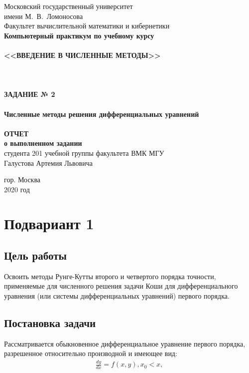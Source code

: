 \documentclass[a4paper,12pt,titlepage,finall]{article}
\begin{document}
\begin{titlepage}
    \begin{center}
	{\small \sc Московский государственный университет \\имени М.~В.~Ломоносова\\
	Факультет вычислительной математики и кибернетики\\}
	\hrulefill
	\vfill
	{\large \bf Компьютерный практикум по учебному курсу}\\
	~\\
	{\Large \bf <<ВВЕДЕНИЕ В ЧИСЛЕННЫЕ МЕТОДЫ>>}\\ 
	~\\
	~\\
	~\\
	{\Large \bf ЗАДАНИЕ № 2}\\
	~\\
	{\bf Численные методы решения дифференциальных уравнений}\\
	~\\
	{\large \bf ОТЧЕТ}\\
	{\bf о выполненном задании}\\
	{студента 201 учебной группы факультета ВМК МГУ}\\
	{Галустова Артемия Львовича}
    \end{center}
    
    \begin{center}
	\vfill
	{\small гор. Москва\\2020 год}
    \end{center}
\end{titlepage}

\tableofcontents
\newpage
\section{Подвариант 1}
\subsection{Цель работы}
Освоить методы Рунге-Кутты второго и четвертого порядка точности,
применяемые для численного решения задачи Коши для дифференциального
уравнения (или системы дифференциальных уравнений) первого порядка.

\subsection{Постановка задачи}
Рассматривается обыкновенное дифференциальное уравнение первого порядка,
разрешенное относительно производной и имеющее вид:
\begin{align*}
\frac{dy}{dx}=f(x,y), x_0 < x,
\end{align*}
\end{document}
